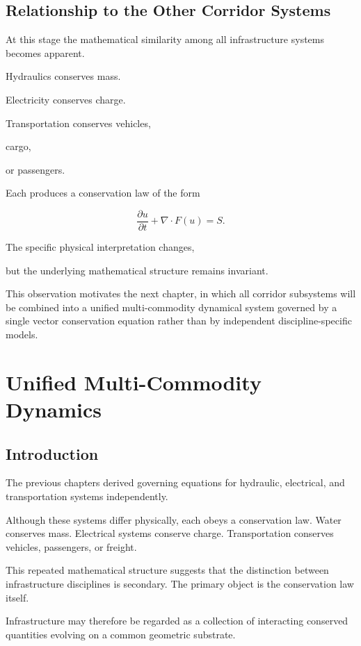 \documentclass[11pt,fleqn]{book}
\numberwithin{equation}{chapter}
\theoremstyle{plain}
\theoremstyle{definition}
\theoremstyle{remark}
\begin{document}
\section{Relationship to the Other Corridor Systems}

At this stage the mathematical similarity among all infrastructure
systems becomes apparent.

Hydraulics conserves mass.

Electricity conserves charge.

Transportation conserves vehicles,

cargo,

or passengers.

Each produces a conservation law of the form

\[
\frac{\partial u}{\partial t}
+
\nabla\cdot F(u)
=
S.
\]

The specific physical interpretation changes,

but the underlying mathematical structure remains invariant.

This observation motivates the next chapter, in which all corridor
subsystems will be combined into a unified multi-commodity dynamical
system governed by a single vector conservation equation rather than by
independent discipline-specific models.

\chapter{Unified Multi-Commodity Dynamics}

\section{Introduction}

The previous chapters derived governing equations for hydraulic,
electrical, and transportation systems independently.

Although these systems differ physically, each obeys a conservation law.
Water conserves mass. Electrical systems conserve charge. Transportation
conserves vehicles, passengers, or freight.

This repeated mathematical structure suggests that the distinction
between infrastructure disciplines is secondary. The primary object is
the conservation law itself.

Infrastructure may therefore be regarded as a collection of interacting
conserved quantities evolving on a common geometric substrate.
\end{document}
